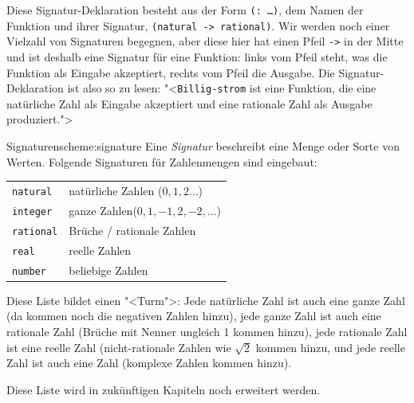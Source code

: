 Diese Signatur-Deklaration besteht aus der Form \texttt{(: \ldots)},
dem Namen der Funktion und ihrer Signatur, \texttt{(natural ->
  rational)}.  Wir werden noch einer Vielzahl von Signaturen begegnen,
aber diese hier hat einen Pfeil \texttt{->} in der Mitte und ist
deshalb eine Signatur für eine Funktion: links vom Pfeil steht, was
die Funktion als Eingabe akzeptiert, rechts vom Pfeil die Ausgabe. Die
Signatur-Deklaration ist also so zu lesen: "<\texttt{Billig-strom} ist
eine Funktion, die eine natürliche Zahl als Eingabe akzeptiert und
eine rationale Zahl als Ausgabe produziert.">

\begin{feature}{Signaturen}{scheme:signature}
  Eine \textit{Signatur} beschreibt eine Menge oder
  Sorte von Werten.  Folgende Signaturen für Zahlenmengen sind
  eingebaut:
  \begin{flushleft}
    \begin{tabular}{ll}
      \texttt{natural\index{natural@\texttt{natural}}} & natürliche
                                                         Zahlen\index{natürliche
                                                         Zahlen} ($0, 1, 2\ldots$)\\
      \texttt{integer\index{integer@\texttt{integer}}} & ganze
                                                         Zahlen\index{ganze
                                                         Zahlen}($0, 1, -1, 2, -2, \ldots$)\\
      \texttt{rational\index{rational@\texttt{rational}}} &
                                                            Brüche\index{Bruch} / rationale Zahlen\index{rationale Zahlen} \\
      \texttt{real\index{real@\texttt{real}}} & reelle
                                                Zahlen\index{reelle Zahlen}\\
      \texttt{number\index{number@\texttt{number}}} & beliebige Zahlen
    \end{tabular}
  \end{flushleft}
  Diese Liste bildet einen "<Turm">: Jede natürliche Zahl ist auch eine
  ganze Zahl (da kommen noch die negativen Zahlen hinzu), jede ganze
  Zahl ist auch eine rationale Zahl (Brüche mit Nenner ungleich 1
  kommen hinzu), jede rationale Zahl ist eine reelle Zahl
  (nicht-rationale Zahlen wie $\sqrt{2}$ kommen hinzu, und jede reelle
  Zahl ist auch eine Zahl (komplexe Zahlen kommen hinzu).
  
  Diese Liste wird in zukünftigen Kapiteln noch erweitert werden.


\end{feature}

